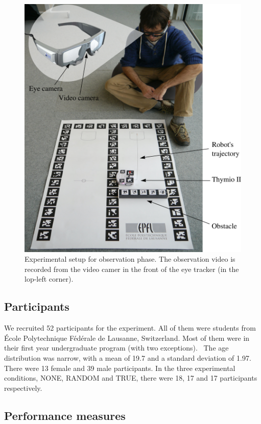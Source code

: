 \documentclass{sig-alternate}
\begin{document}
\begin{figure}
    \centering
    \includegraphics[width=0.9\linewidth]{setup}
    \caption{\small Experimental setup for observation phase. The observation
    video is recorded from the video camer in the front of the eye tracker (in
    the lop-left corner).}

    \label{expe}
\end{figure}

\subsection{Participants}

We recruited 52 participants for the experiment. All of them were
students from École Polytechnique Fédérale de Lausanne, Switzerland.
Most of them were in their first year undergraduate program (with two
exceptions). ~The age distribution was narrow, with a mean of 19.7 and a
standard deviation of 1.97. There were 13 female and 39 male
participants. In the three experimental conditions, {\sf NONE}, {\sf RANDOM} and
{\sf TRUE}, there were 18, 17 and 17 participants respectively.

\subsection{Performance measures}
\end{document}
